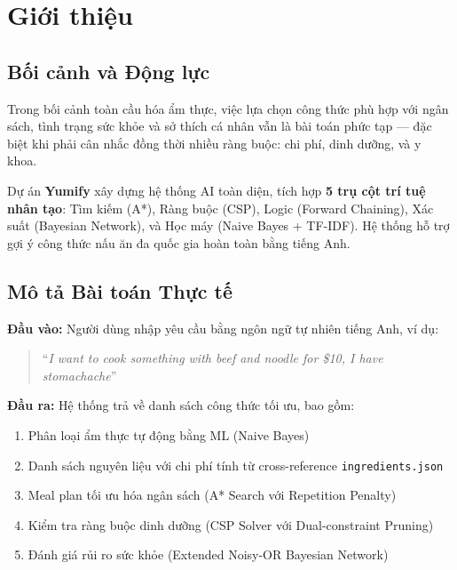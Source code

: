 
\section{Giới thiệu}
\label{sec:intro}

\subsection{Bối cảnh và Động lực}
Trong bối cảnh toàn cầu hóa ẩm thực, việc lựa chọn công thức phù hợp với ngân sách, tình trạng sức khỏe và sở thích cá nhân vẫn là bài toán phức tạp --- đặc biệt khi phải cân nhắc đồng thời nhiều ràng buộc: chi phí, dinh dưỡng, và y khoa.

Dự án \textbf{Yumify} xây dựng hệ thống AI toàn diện, tích hợp \textbf{5 trụ cột trí tuệ nhân tạo}: Tìm kiếm (A*), Ràng buộc (CSP), Logic (Forward Chaining), Xác suất (Bayesian Network), và Học máy (Naive Bayes + TF-IDF). Hệ thống hỗ trợ gợi ý công thức nấu ăn đa quốc gia hoàn toàn bằng tiếng Anh.

\subsection{Mô tả Bài toán Thực tế}
\textbf{Đầu vào:} Người dùng nhập yêu cầu bằng ngôn ngữ tự nhiên tiếng Anh, ví dụ:
\begin{quote}
``\textit{I want to cook something with beef and noodle for \$10, I have stomachache}''
\end{quote}

\textbf{Đầu ra:} Hệ thống trả về danh sách công thức tối ưu, bao gồm:
\begin{enumerate}
  \item Phân loại ẩm thực tự động bằng ML (Naive Bayes)
  \item Danh sách nguyên liệu với chi phí tính từ cross-reference \texttt{ingredients.json}
  \item Meal plan tối ưu hóa ngân sách (A* Search với Repetition Penalty)
  \item Kiểm tra ràng buộc dinh dưỡng (CSP Solver với Dual-constraint Pruning)
  \item Đánh giá rủi ro sức khỏe (Extended Noisy-OR Bayesian Network)
\end{enumerate}

